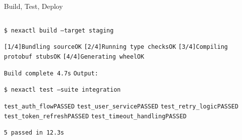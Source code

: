 \documentclass[10pt,aspectratio=169]{beamer}
\begin{document}
\begin{frame}{Build, Test, Deploy}

  \begin{columns}[T,onlytextwidth]
    \begin{terminal}
\vspace{2pt}
\textcolor{termPrompt}{\texttt{\$~}\textcolor{textLight}{\texttt{nexactl build --target staging}}}
\vspace{1pt}

\textcolor{textMuted}{\texttt{[1/4]}}\hspace{4pt}\textcolor{termGreen}{\texttt{Bundling source\dotfill{}OK}}
\textcolor{textMuted}{\texttt{[2/4]}}\hspace{4pt}\textcolor{termGreen}{\texttt{Running type checks\dotfill{}OK}}
\textcolor{textMuted}{\texttt{[3/4]}}\hspace{4pt}\textcolor{termGreen}{\texttt{Compiling protobuf stubs\dotfill{}OK}}
\textcolor{textMuted}{\texttt{[4/4]}}\hspace{4pt}\textcolor{termGreen}{\texttt{Generating wheel\dotfill{}OK}}

\vspace{3pt}
\textcolor{accentCyan}{\texttt{Build complete \textemdash{} 4.7s}}
\textcolor{textMuted}{\texttt{Output: }}

\vspace{4pt}
\textcolor{termPrompt}{\texttt{\$~}\textcolor{textLight}{\texttt{nexactl test --suite integration}}}
\vspace{1pt}

\textcolor{termGreen}{\texttt{test\_auth\_flow\dotfill{}PASSED}}
\textcolor{termGreen}{\texttt{test\_user\_service\dotfill{}PASSED}}
\textcolor{termGreen}{\texttt{test\_retry\_logic\dotfill{}PASSED}}
\textcolor{termGreen}{\texttt{test\_token\_refresh\dotfill{}PASSED}}
\textcolor{termGreen}{\texttt{test\_timeout\_handling\dotfill{}PASSED}}

\vspace{3pt}
\textcolor{accentCyan}{\texttt{5 passed in 12.3s}}
\vspace{2pt}
    \end{terminal}


\end{columns}
\end{frame}
\end{document}
